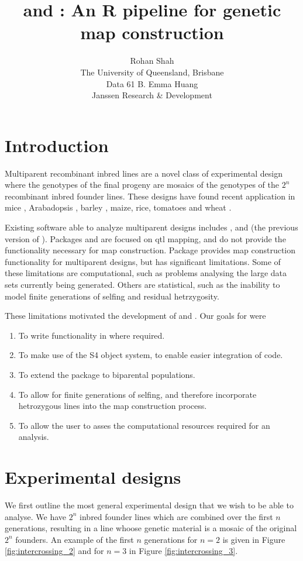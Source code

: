 \documentclass[a4paper, nojss, shortnames]{jss}\usepackage[]{graphicx}\usepackage[]{color}
\author{Rohan Shah\\The University of Queensland, Brisbane\\Data 61 \And B. Emma Huang\\Janssen Research \& Development
}
\title{\pkg{mpMap2} and \pkg{mpMapInteractive2}: An R pipeline for genetic map construction}
\begin{document}
\section{Introduction}

Multiparent recombinant inbred lines are a novel class of experimental design where the genotypes of the final progeny are mosaics of the genotypes of the $2^n$ recombinant inbred founder lines. These designs have found recent application in mice \citep{Churchill2004}, Arabadopsis \citep{Kover2009}, barley \citep{Sannemann2015}, maize, rice, tomatoes \citep{Pascual2015} and wheat \citep{Huang2012, Mackay2014}. 

Existing software able to analyze multiparent designs includes ,  and  (the previous version of ). Packages  and  are focused on qtl mapping, and do not provide the functionality necessary for map construction. Package  provides map construction functionality for multiparent designs, but has significant limitations. Some of these limitations are computational, such as problems analysing the large data sets currently being generated. Others are statistical, such as the inability to model finite generations of selfing and residual hetrzygosity. 

These limitations motivated the development of  and . Our goals for  were
\begin{enumerate}
\item To write functionality in  where required. 
\item To make use of the S4 object system, to enable easier integration of  code.
\item To extend the package to biparental populations. 
\item To allow for finite generations of selfing, and therefore incorporate hetrozygous lines into the map construction process. 
\item To allow the user to asses the computational resources required for an analysis. 
\end{enumerate}

\section{Experimental designs}

We first outline the most general experimental design that we wish to be able to analyse. We have $2^n$ inbred founder lines which are combined over the first $n$ generations, resulting in a line whoose genetic material is a mosaic of the original $2^n$ founders. An example of the first $n$ generations for $n = 2$ is given in Figure \ref{fig:intercrossing_2} and for $n = 3$ in Figure \ref{fig:intercrossing_3}. 
\end{document}
